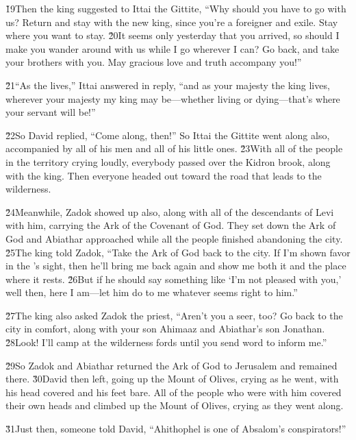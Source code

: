 \v{19}Then the king suggested to Ittai the Gittite, ``Why should you have to go with us? Return and stay with the new king, since you're a foreigner and exile. Stay where you want to stay. \v{20}It seems only yesterday that you arrived, so should I make you wander around with us while I go wherever I can? Go back, and take your brothers with you. May gracious love and truth accompany you!''

\v{21}``As the  lives,'' Ittai answered in reply, ``and as your majesty the king lives, wherever your majesty my king may be---whether living or dying---that's where your servant will be!''

\v{22}So David replied, ``Come along, then!'' So Ittai the Gittite went along also, accompanied by all of his men and all of his little ones. \v{23}With all of the people in the territory crying loudly, everybody passed over the Kidron brook, along with the king. Then everyone headed out toward the road that leads to the wilderness.

\v{24}Meanwhile, Zadok showed up also, along with all of the descendants of Levi with him, carrying the Ark of the Covenant of God. They set down the Ark of God and Abiathar approached while all the people finished abandoning the city. \v{25}The king told Zadok, ``Take the Ark of God back to the city. If I'm shown favor in the 's sight, then he'll bring me back again and show me both it and the place where it rests. \v{26}But if he should say something like `I'm not pleased with you,' well then, here I am---let him do to me whatever seems right to him.''

\v{27}The king also asked Zadok the priest, ``Aren't you a seer, too? Go back to the city in comfort, along with your son Ahimaaz and Abiathar's son Jonathan. \v{28}Look! I'll camp at the wilderness fords until you send word to inform me.''

\v{29}So Zadok and Abiathar returned the Ark of God to Jerusalem and remained there. \v{30}David then left, going up the Mount of Olives, crying as he went, with his head covered and his feet bare. All of the people who were with him covered their own heads and climbed up the Mount of Olives, crying as they went along.

\v{31}Just then, someone told David, ``Ahithophel is one of Absalom's conspirators!''

